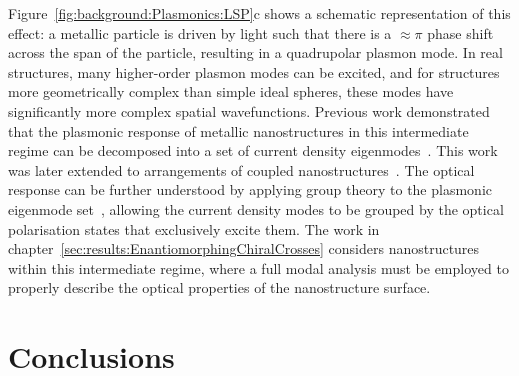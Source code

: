 Figure~\ref{fig:background:Plasmonics:LSP}c shows a schematic representation of this effect: a metallic particle is driven by light such that there is a $\approx \pi$ phase shift across the span of the particle, resulting in a quadrupolar plasmon mode. In real structures, many higher-order plasmon modes can be excited, and for structures more geometrically complex than simple ideal spheres, these modes have significantly more complex spatial wavefunctions. Previous work demonstrated that the plasmonic response of metallic nanostructures in this intermediate regime can be decomposed into a set of current density eigenmodes~\cite{Zheng2012}. This work was later extended to arrangements of coupled nanostructures~\cite{Zheng2013}. The optical response can be further understood by applying group theory to the plasmonic eigenmode set~\cite{Zheng2015}, allowing the current density modes to be grouped by the optical polarisation states that exclusively excite them. The work in chapter~\ref{sec:results:EnantiomorphingChiralCrosses} considers nanostructures within this intermediate regime, where a full modal analysis must be employed to properly describe the optical properties of the nanostructure surface.

\section{Conclusions}

